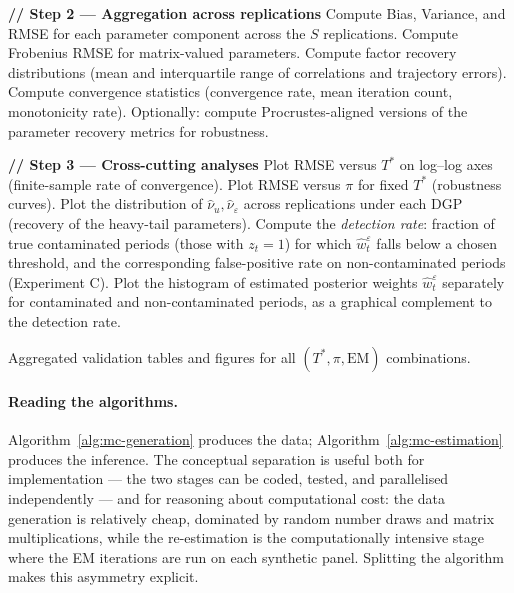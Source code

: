 \documentclass[11pt, a4paper, oneside]{article}
\begin{document}
\begin{algorithm}[H]
\begin{algorithmic}[1]
\vspace{0.5em}
\State \textbf{// Step 2 — Aggregation across replications}
    \State Compute Bias, Variance, and RMSE for each parameter
           component across the $S$ replications.
    \State Compute Frobenius RMSE for matrix-valued parameters.
    \State Compute factor recovery distributions (mean and
           interquartile range of correlations and trajectory
           errors).
    \State Compute convergence statistics
           (convergence rate, mean iteration count,
           monotonicity rate).
    \State Optionally: compute Procrustes-aligned versions of the
           parameter recovery metrics for robustness.
\EndFor

\vspace{0.3em}
\State \textbf{// Step 3 — Cross-cutting analyses}
\State Plot RMSE versus $T^*$ on log--log axes
       (finite-sample rate of convergence).
\State Plot RMSE versus $\pi$ for fixed $T^*$
       (robustness curves).
\State Plot the distribution of
       $\hat{\nu}_u, \hat{\nu}_\varepsilon$
       across replications under each DGP
       (recovery of the heavy-tail parameters).
\State Compute the \emph{detection rate}: fraction of true
       contaminated periods (those with $z_t = 1$) for which
       $\hat{w}^{\varepsilon}_t$ falls below a chosen threshold,
       and the corresponding false-positive rate on
       non-contaminated periods (Experiment C).
\State Plot the histogram of estimated posterior weights
       $\hat{w}^{\varepsilon}_t$ separately for contaminated
       and non-contaminated periods, as a graphical complement
       to the detection rate.

\vspace{0.3em}
\State \Return Aggregated validation tables and figures for all
        $(T^*, \pi, \mathrm{EM})$ combinations.
\end{algorithmic}
\end{algorithm}

\paragraph{Reading the algorithms.}
Algorithm~\ref{alg:mc-generation} produces the data; 
Algorithm~\ref{alg:mc-estimation} produces the inference. The
conceptual separation is useful both for implementation — the
two stages can be coded, tested, and parallelised independently — and
for reasoning about computational cost: the data generation is
relatively cheap, dominated by random number draws and matrix
multiplications, while the re-estimation is the computationally
intensive stage where the EM iterations are run on each synthetic
panel. Splitting the algorithm makes this asymmetry explicit.
\end{document}

